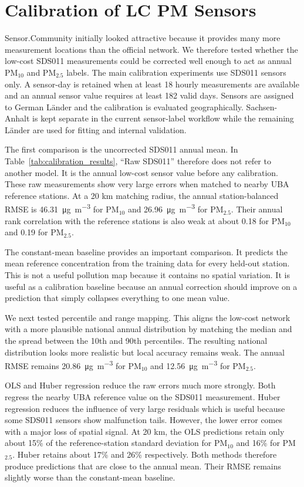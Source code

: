 \documentclass[english, a4paper]{article}
\begin{document}
\section{Calibration of LC PM Sensors}
\label{sec:calibration}

Sensor.Community initially looked attractive because it provides many more measurement locations than the official network. We therefore tested whether the low-cost SDS011 measurements could be corrected well enough to act as annual PM$_{10}$ and PM$_{2.5}$ labels. The main calibration experiments use SDS011 sensors only. A sensor-day is retained when at least 18 hourly measurements are available and an annual sensor value requires at least 182 valid days. Sensors are assigned to German Länder and the calibration is evaluated geographically. Sachsen-Anhalt is kept separate in the current sensor-label workflow while the remaining Länder are used for fitting and internal validation.

The first comparison is the uncorrected SDS011 annual mean. In Table~\ref{tab:calibration_results}, ``Raw SDS011'' therefore does not refer to another model. It is the annual low-cost sensor value before any calibration. These raw measurements show very large errors when matched to nearby UBA reference stations. At a 20 km matching radius, the annual station-balanced RMSE is \SI{46.31}{\micro\gram\per\cubic\meter} for PM$_{10}$ and \SI{26.96}{\micro\gram\per\cubic\meter} for PM$_{2.5}$. Their annual rank correlation with the reference stations is also weak at about 0.18 for PM$_{10}$ and 0.19 for PM$_{2.5}$.

The constant-mean baseline provides an important comparison. It predicts the mean reference concentration from the training data for every held-out station. This is not a useful pollution map because it contains no spatial variation. It is useful as a calibration baseline because an annual correction should improve on a prediction that simply collapses everything to one mean value.

We next tested percentile and range mapping. This aligns the low-cost network with a more plausible national annual distribution by matching the median and the spread between the 10th and 90th percentiles. The resulting national distribution looks more realistic but local accuracy remains weak. The annual RMSE remains \SI{20.86}{\micro\gram\per\cubic\meter} for PM$_{10}$ and \SI{12.56}{\micro\gram\per\cubic\meter} for PM$_{2.5}$.

OLS and Huber regression reduce the raw errors much more strongly. Both regress the nearby UBA reference value on the SDS011 measurement. Huber regression reduces the influence of very large residuals which is useful because some SDS011 sensors show malfunction tails. However, the lower error comes with a major loss of spatial signal. At 20 km, the OLS predictions retain only about 15\% of the reference-station standard deviation for PM$_{10}$ and 16\% for PM$_{2.5}$. Huber retains about 17\% and 26\% respectively. Both methods therefore produce predictions that are close to the annual mean. Their RMSE remains slightly worse than the constant-mean baseline.
\end{document}
